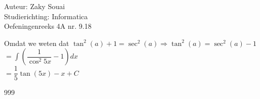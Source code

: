 \documentclass[a4paper]{article}
\begin{document}
  
\noindent \large Auteur: Zaky Souai \\
\noindent \large Studierichting:  Informatica\\
\noindent \large Oefeningenreeks 4A nr. 9.18\\

\bigskip

\normalsize

Omdat we weten dat $\tan^2(a) + 1 = \sec^2(a) \Rightarrow \tan^2(a) = \sec^2(a) - 1$ \\

$= \displaystyle\int \left(\dfrac{1}{\cos^2 5x} - 1\right) dx $\\

$= \dfrac{1}{5}\tan(5x) - x + C $\\

\begin{thebibliography}{999}
\end{thebibliography}
\end{document}
